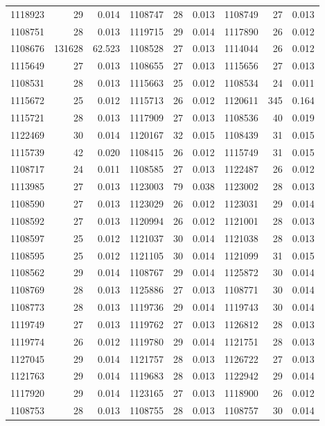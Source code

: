 \documentclass[11pt,a4paper]{article}
\begin{document}
\begin{longtable}{rrr|rrr|rrr}
1118923 & 29 & 0.014 & 1108747 & 28 & 0.013 & 1108749 & 27 & 0.013\\
1108751 & 28 & 0.013 & 1119715 & 29 & 0.014 & 1117890 & 26 & 0.012\\
1108676 & 131628 & 62.523 & 1108528 & 27 & 0.013 & 1114044 & 26 & 0.012\\
1115649 & 27 & 0.013 & 1108655 & 27 & 0.013 & 1115656 & 27 & 0.013\\
1108531 & 28 & 0.013 & 1115663 & 25 & 0.012 & 1108534 & 24 & 0.011\\
1115672 & 25 & 0.012 & 1115713 & 26 & 0.012 & 1120611 & 345 & 0.164\\
1115721 & 28 & 0.013 & 1117909 & 27 & 0.013 & 1108536 & 40 & 0.019\\
1122469 & 30 & 0.014 & 1120167 & 32 & 0.015 & 1108439 & 31 & 0.015\\
1115739 & 42 & 0.020 & 1108415 & 26 & 0.012 & 1115749 & 31 & 0.015\\
1108717 & 24 & 0.011 & 1108585 & 27 & 0.013 & 1122487 & 26 & 0.012\\
1113985 & 27 & 0.013 & 1123003 & 79 & 0.038 & 1123002 & 28 & 0.013\\
1108590 & 27 & 0.013 & 1123029 & 26 & 0.012 & 1123031 & 29 & 0.014\\
1108592 & 27 & 0.013 & 1120994 & 26 & 0.012 & 1121001 & 28 & 0.013\\
1108597 & 25 & 0.012 & 1121037 & 30 & 0.014 & 1121038 & 28 & 0.013\\
1108595 & 25 & 0.012 & 1121105 & 30 & 0.014 & 1121099 & 31 & 0.015\\
1108562 & 29 & 0.014 & 1108767 & 29 & 0.014 & 1125872 & 30 & 0.014\\
1108769 & 28 & 0.013 & 1125886 & 27 & 0.013 & 1108771 & 30 & 0.014\\
1108773 & 28 & 0.013 & 1119736 & 29 & 0.014 & 1119743 & 30 & 0.014\\
1119749 & 27 & 0.013 & 1119762 & 27 & 0.013 & 1126812 & 28 & 0.013\\
1119774 & 26 & 0.012 & 1119780 & 29 & 0.014 & 1121751 & 28 & 0.013\\
1127045 & 29 & 0.014 & 1121757 & 28 & 0.013 & 1126722 & 27 & 0.013\\
1121763 & 29 & 0.014 & 1119683 & 28 & 0.013 & 1122942 & 29 & 0.014\\
1117920 & 29 & 0.014 & 1123165 & 27 & 0.013 & 1118900 & 26 & 0.012\\
1108753 & 28 & 0.013 & 1108755 & 28 & 0.013 & 1108757 & 30 & 0.014\\

\end{longtable}
\end{document}

